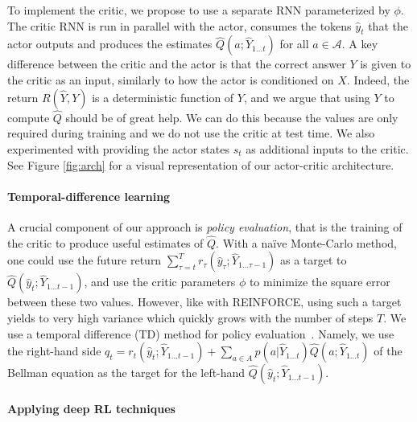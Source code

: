 \documentclass{article} %
\begin{document}
To implement the critic, we propose to use a separate RNN parameterized by $\phi$.
The critic RNN is run
 in parallel with the actor, consumes the tokens $\hat{y}_t$
that the actor outputs and
 produces the estimates $\hat{Q}(a;\hat{Y}_{1
\ldots t})$ for all $a \in \mathcal{A}$. 
 A key difference between the critic
and the actor is that the
 correct answer $Y$ is given to the critic as an
input, similarly to how the actor
 is conditioned on $X$. Indeed, the return
$R(\hat{Y}, Y)$ is a deterministic
 function of $Y$, and we argue that using
$Y$ to compute $\hat{Q}$ should be of
 great help.  We can do this because the
values are only required during training and we do not use the critic at test
time.  We also experimented with providing the actor states $s_t$ as additional
 inputs to the critic.
 See Figure \ref{fig:arch} for a visual
representation of our actor-critic architecture.


\paragraph{Temporal-difference learning}
A crucial component of our approach is \emph{policy evaluation}, that is the training of the critic
to produce useful estimates of $\hat{Q}$. With a na{\"i}ve Monte-Carlo method, one could use the future
return $\sum_{\tau=t}^T r_{\tau}(\hat{y}_{\tau}; \hat{Y}_{1 \ldots \tau
- 1})$ as a target to $\hat{Q}(\hat{y}_t; \hat{Y}_{1 \ldots t - 1})$, and use the
critic parameters $\phi$ to minimize the square error between these two values.
However, like with REINFORCE, using such a target yields to
very high variance which quickly grows with the number
of steps $T$.
We use a temporal difference (TD) method for policy
evaluation~\citep{sutton1988learning}. Namely, we use the right-hand side 
$q_t=r_t(\hat{y}_t;\hat{Y}_{1 \ldots t - 1}) + \sum_{a \in A}
p(a|\hat{Y}_{1 \ldots t}) \hat{Q}(a;\hat{Y}_{1 \ldots t})$ of the Bellman equation as the
target for the left-hand $\hat{Q}(\hat{y}_t; \hat{Y}_{1 \ldots t - 1})$.



\paragraph{Applying deep RL techniques}
\end{document}
